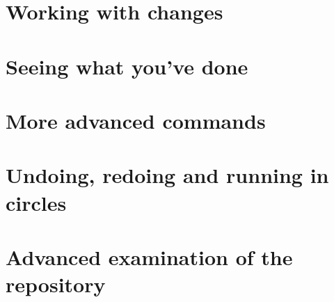 \documentclass{book}
\begin{document}








\section{Working with changes}











\section{Seeing what you've done}







\section{More advanced commands}









\section{Undoing, redoing and running in circles}











\section{Advanced examination of the repository}
\end{document}
